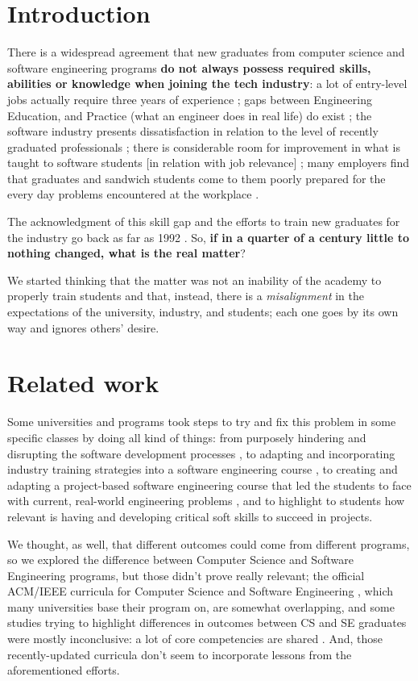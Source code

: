 \documentclass{sigchi}
\begin{document}
\section{Introduction}
There is a widespread agreement that new graduates from computer science and software engineering programs \textbf{do not always possess required skills, abilities or knowledge when joining the tech industry}: a lot of entry-level jobs actually require three years of experience \cite{Chakrabarti2018}; gaps between Engineering Education, and Practice (what an engineer does in real life) do exist \cite{Sivanesan2017}; the software industry presents dissatisfaction in relation to the level of recently graduated professionals \cite{Portela2017}; there is considerable room for improvement in what is taught to software students [in relation with job relevance] \cite{Lethbridgea}; many employers find that graduates and sandwich students come to them poorly prepared for the every day problems encountered at the workplace \cite{Dawson2000}.

The acknowledgment of this skill gap and the efforts to train new graduates for the industry go back as far as 1992 \cite{Dawson1992}. So, \textbf{if in a quarter of a century little to nothing changed, what is the real matter}?

We started thinking that the matter was not an inability of the academy to properly train students and that, instead, there is a \textit{misalignment} in the expectations of the university, industry, and students; each one goes by its own way and ignores others' desire.

\section{Related work}
Some universities and programs took steps to try and fix this problem in some specific classes by doing all kind of things: from purposely hindering and disrupting the software development processes \cite{Dawson2000}, to adapting and incorporating industry training strategies into a software engineering course \cite{Portela2017}, to creating and adapting a project-based software engineering course that led the students to face with current, real-world engineering problems \cite{Delgado2017}, and to highlight to students how relevant is having and developing critical soft skills to succeed in projects\cite{Bastarrica2017}.

We thought, as well, that different outcomes could come from different programs, so we explored the difference between Computer Science and Software Engineering programs, but those didn't prove really relevant; the official ACM/IEEE curricula for Computer Science \cite{Force2013} and Software Engineering \cite{Ardis2015}, which many universities base their program on, are somewhat overlapping, and some studies trying to highlight differences in outcomes between CS and SE graduates were mostly inconclusive: a lot of core competencies are shared \cite{Meziane2004} \cite{Rasool2014}. And, those recently-updated curricula don't seem to incorporate lessons from the aforementioned efforts.
\end{document}
